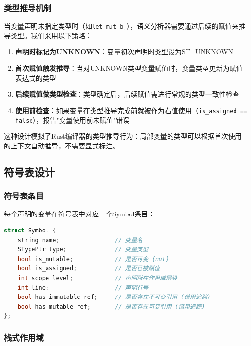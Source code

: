 \documentclass[12pt,a4paper]{ctexart}
\begin{document}
\subsubsection{类型推导机制}

当变量声明未指定类型时（如\texttt{let mut b;}），语义分析器需要通过后续的赋值来推导类型。我们采用以下策略：

\begin{enumerate}
    \item \textbf{声明时标记为UNKNOWN}：变量初次声明时类型设为ST\_UNKNOWN
    \item \textbf{首次赋值触发推导}：当对UNKNOWN类型变量赋值时，变量类型更新为赋值表达式的类型
    \item \textbf{后续赋值做类型检查}：类型确定后，后续赋值需进行常规的类型一致性检查
    \item \textbf{使用前检查}：如果变量在类型推导完成前就被作为右值使用（\texttt{is\_assigned == false}），报告"变量使用前未赋值"错误
\end{enumerate}

这种设计模拟了Rust编译器的类型推导行为：局部变量的类型可以根据首次使用的上下文自动推导，不需要显式标注。

\subsection{符号表设计}

\subsubsection{符号表条目}

每个声明的变量在符号表中对应一个Symbol条目：

\begin{lstlisting}[language=C++, caption={Symbol结构体}]
struct Symbol {
    string name;                // 变量名
    STypePtr type;              // 变量类型
    bool is_mutable;            // 是否可变 (mut)
    bool is_assigned;           // 是否已被赋值
    int scope_level;            // 声明所在作用域层级
    int line;                   // 声明行号
    bool has_immutable_ref;     // 是否存在不可变引用 (借用追踪)
    bool has_mutable_ref;       // 是否存在可变引用 (借用追踪)
};
\end{lstlisting}

\subsubsection{栈式作用域}
\end{document}
